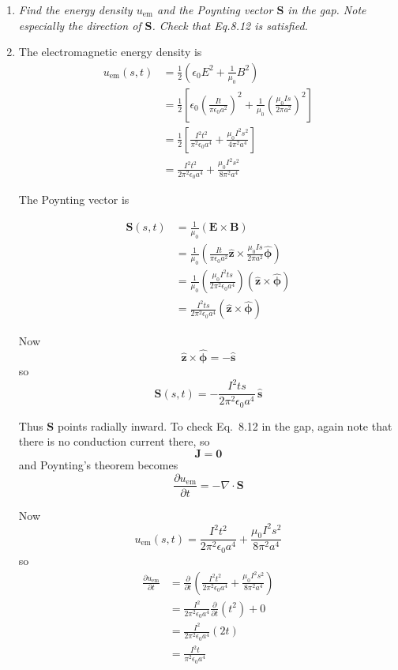 \documentclass[12pt]{article}
\begin{document}
\begin{enumerate}
Thus
$$
\boxed{\mathbf B(s,t)=\frac{\mu_0 I s}{2\pi a^2}\,\hat{\boldsymbol\phi}
\qquad
(s<a)}
$$

\item[(b)] \textit{Find the energy density $u_{\mathrm{em}}$ and the Poynting vector $\mathbf{S}$ in the gap. Note especially the direction of $\mathbf{S}$. Check that Eq.8.12 is satisfied.}
\item[Solution] The electromagnetic energy density is
$$
\begin{aligned}
u_{\text{em}}(s,t) &=  \frac{1}{2}\left(\epsilon_0E^2+\frac{1}{\mu_0}B^2\right)\\
&=
\frac{1}{2}\left[
\epsilon_0\left(\frac{It}{\pi\epsilon_0 a^2}\right)^2
+
\frac{1}{\mu_0}\left(\frac{\mu_0 I s}{2\pi a^2}\right)^2
\right] \\
&=
\frac{1}{2}\left[
\frac{I^2t^2}{\pi^2\epsilon_0 a^4}
+
\frac{\mu_0 I^2 s^2}{4\pi^2 a^4}
\right] \\
&=
\frac{I^2t^2}{2\pi^2\epsilon_0 a^4}
+
\frac{\mu_0 I^2 s^2}{8\pi^2 a^4}
\end{aligned}
$$

The Poynting vector is

$$
\begin{aligned}
\mathbf S(s,t)
&=\frac{1}{\mu_0}(\mathbf E\times \mathbf B)\\
&=
\frac{1}{\mu_0}
\left(
\frac{It}{\pi\epsilon_0 a^2}\hat{\mathbf z}
\times
\frac{\mu_0 I s}{2\pi a^2}\hat{\boldsymbol\phi}
\right) \\
&=
\frac{1}{\mu_0}
\left(
\frac{\mu_0 I^2ts}{2\pi^2\epsilon_0 a^4}
\right)
(\hat{\mathbf z}\times \hat{\boldsymbol\phi}) \\
&=
\frac{I^2ts}{2\pi^2\epsilon_0 a^4}
(\hat{\mathbf z}\times \hat{\boldsymbol\phi})
\end{aligned}
$$

Now
$$
\hat{\mathbf z}\times \hat{\boldsymbol\phi}=-\hat{\mathbf s}
$$
so
$$
\boxed{
\mathbf S(s,t)
=
-\frac{I^2ts}{2\pi^2\epsilon_0 a^4}\,\hat{\mathbf s}
}
$$

Thus \(\mathbf S\) points radially inward. To check Eq.~8.12 in the gap, again note that there is no conduction current there, so
$$
\mathbf J=\mathbf 0
$$
and Poynting's theorem becomes
$$
\frac{\partial u_{\text{em}}}{\partial t}=-\nabla\cdot \mathbf S
$$

Now
$$
u_{\text{em}}(s,t)
=
\frac{I^2t^2}{2\pi^2\epsilon_0 a^4}
+
\frac{\mu_0 I^2 s^2}{8\pi^2 a^4}
$$
so
$$
\begin{aligned}
\frac{\partial u_{\text{em}}}{\partial t}
&=
\frac{\partial}{\partial t}
\left(
\frac{I^2t^2}{2\pi^2\epsilon_0 a^4}
+
\frac{\mu_0 I^2 s^2}{8\pi^2 a^4}
\right) \\
&=
\frac{I^2}{2\pi^2\epsilon_0 a^4}\frac{\partial}{\partial t}(t^2)
+
0 \\
&=
\frac{I^2}{2\pi^2\epsilon_0 a^4}(2t) \\
&=
\frac{I^2t}{\pi^2\epsilon_0 a^4}
\end{aligned}
$$


\end{enumerate}
\end{document}
